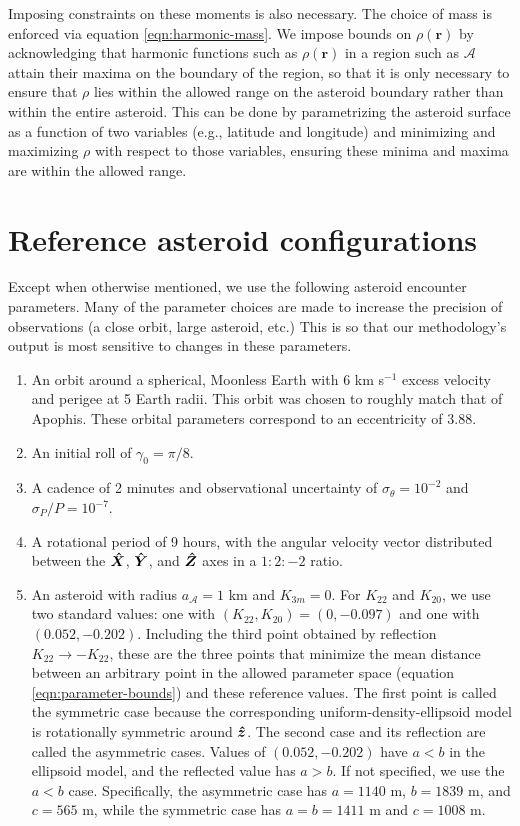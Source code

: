 Imposing constraints on these moments is also necessary. The choice of mass is enforced via equation \ref{eqn:harmonic-mass}. We impose bounds on $\rho(\bm r)$ by acknowledging that harmonic functions such as $\rho(\bm r)$ in a region such as $\mathcal{A}$ attain their maxima on the boundary of the region, so that it is only necessary to ensure that $\rho$ lies within the allowed range on the asteroid boundary rather than within the entire asteroid. This can be done by parametrizing the asteroid surface as a function of two variables (e.g., latitude and longitude) and minimizing and maximizing $\rho$ with respect to those variables, ensuring these minima and maxima are within the allowed range.




\section{Reference asteroid configurations}
\label{app:reference-configs}

Except when otherwise mentioned, we use the following asteroid encounter parameters. Many of the parameter choices are made to increase the precision of observations (a close orbit, large asteroid, etc.) This is so that our methodology's output is most sensitive to changes in these parameters.

\begin{enumerate}
  \item An orbit around a spherical, Moonless Earth with $6$ km s$^{-1}$ excess velocity and perigee at 5 Earth radii. This orbit was chosen to roughly match that of Apophis. These orbital parameters correspond to an eccentricity of 3.88. 
  \item An initial roll of $\gamma_0=\pi/8$.
  \item A cadence of 2 minutes and observational uncertainty of $\sigma_\theta = 10^{-2}$ and $\sigma_P / P = 10^{-7}$.
  \item A rotational period of 9 hours, with the angular velocity vector distributed between the $\bm{\hat{X}}$, $\bm{\hat{Y}}$, and $\bm{\hat{Z}}$ axes in a $1:2:-2$ ratio.
  \item An asteroid with radius $a_\mathcal{A} = 1$ km and $K_{3m}=0$. For $K_{22}$ and $K_{20}$, we use two standard values: one with $(K_{22}, K_{20}) = (0, -0.097)$ and one with $(0.052, -0.202)$. Including the third point obtained by reflection $K_{22}\rightarrow -K_{22}$, these are the three points that minimize the mean distance between an arbitrary point in the allowed parameter space (equation \ref{eqn:parameter-bounds}) and these reference values. The first point is called the symmetric case because the corresponding uniform-density-ellipsoid model is rotationally symmetric around $\bm{\hat{z}}$. The second case and its reflection are called the asymmetric cases. Values of $(0.052, -0.202)$ have $a < b$ in the ellipsoid model, and the reflected value has $a > b$. If not specified, we use the $a < b$ case. Specifically, the asymmetric case has $a=1140$ m, $b=1839$ m, and $c=565$ m, while the symmetric case has $a=b=1411$ m and $c=1008$ m.
\end{enumerate}

